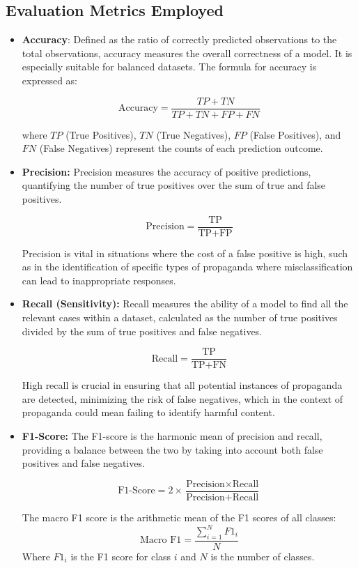 \documentclass[twocolumn]{article}
\begin{document}
\subsection*{Evaluation Metrics Employed}
\begin{itemize}
  \item \textbf{Accuracy}: Defined as the ratio of correctly predicted observations to the total observations, accuracy measures the overall correctness of a model. It is especially suitable for balanced datasets. The formula for accuracy is expressed as:

        \[
          \text{Accuracy} = \frac{TP + TN}{TP + TN + FP + FN}
        \]

        where \(TP\) (True Positives), \(TN\) (True Negatives), \(FP\) (False Positives), and \(FN\) (False Negatives) represent the counts of each prediction outcome.

  \item \textbf{Precision:} Precision measures the accuracy of positive predictions, quantifying the number of true positives  over the sum of true and false positives.

        \[\text{Precision} = \frac{\text{TP}}{\text{TP} + \text{FP}}\]

        Precision is vital in situations where the cost of a false positive is high, such as in the identification of specific types of propaganda where misclassification can lead to inappropriate responses.

  \item \textbf{Recall (Sensitivity):} Recall measures the ability of a model to find all the relevant cases within a dataset, calculated as the number of true positives divided by the sum of true positives and false negatives.

        \[\text{Recall} = \frac{\text{TP}}{\text{TP} + \text{FN}}\]

        High recall is crucial in ensuring that all potential instances of propaganda are detected, minimizing the risk of false negatives, which in the context of propaganda could mean failing to identify harmful content.


  \item \textbf{F1-Score:} The F1-score is the harmonic mean of precision and recall, providing a balance between the two by taking into account both false positives and false negatives.

        \[
          \text{F1-Score} = 2 \times \frac{\text{Precision} \times \text{Recall}}{\text{Precision} + \text{Recall}}
        \]

        The macro F1 score is the arithmetic mean of the F1 scores of all classes:
        \[
          \text{Macro F1} = \frac{\sum_{i=1}^{N} F1_i}{N}
        \]
        Where \( F1_i \) is the F1 score for class \( i \) and \( N \) is the number of classes.

\end{itemize}
\end{document}
